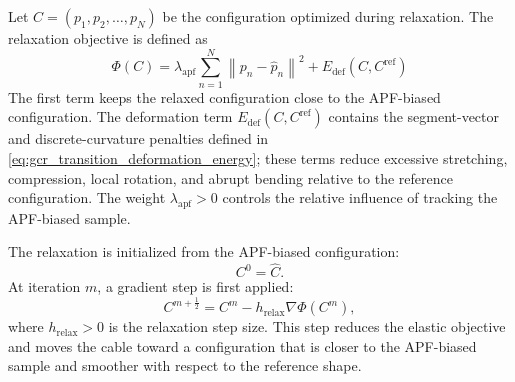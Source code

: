 \documentclass{pas}
\begin{document}
Let \(C=(p_1,p_2,\ldots,p_N)\) be the configuration optimized during
relaxation. The relaxation objective is defined as
\begin{equation}
\Phi(C)
=
\lambda_{\mathrm{apf}}
\sum_{n=1}^{N}
\left\|
p_n-\widehat{p}_n
\right\|^2
+
E_{\mathrm{def}}(C,C^{\mathrm{ref}})
\label{eq:relaxation_objective}
\end{equation}
The first term keeps the relaxed configuration close to the APF-biased configuration. The deformation term \(E_{\mathrm{def}}(C,C^{\mathrm{ref}})\) contains the segment-vector and discrete-curvature penalties defined in \eqref{eq:gcr_transition_deformation_energy}; these terms reduce excessive stretching, compression, local rotation, and abrupt bending relative to the reference configuration. The weight \(\lambda_{\mathrm{apf}}>0\) controls the relative influence of tracking the APF-biased sample.

The relaxation is initialized from the APF-biased configuration:
\begin{equation}
C^0=\widehat{C}.
\label{eq:relaxation_initial_condition}
\end{equation}
At iteration \(m\), a gradient step is first applied:
\begin{equation}
C^{m+\frac{1}{2}}
=
C^m
-
h_{\mathrm{relax}}
\nabla \Phi(C^m),
\label{eq:relaxation_gradient_step}
\end{equation}
where \(h_{\mathrm{relax}}>0\) is the relaxation step size. This step reduces
the elastic objective and moves the cable toward a configuration that is closer
to the APF-biased sample and smoother with respect to the reference shape.
\end{document}
